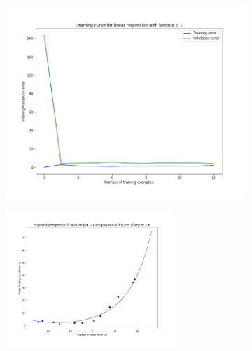 \documentclass[english,11pt]{article}
\begin{document}
\begin{figure}[H]
\centering
\begin{subfigure}{.5\textwidth}
\centering
\includegraphics[width=.7\linewidth]{../hw1/part2/fig3_2_A4_learning_curve_lambda_1.png}
\end{subfigure}%
\begin{subfigure}{.5\textwidth}
\centering
\includegraphics[width=0.7\textwidth]{../hw1/part2/fig3_2_A4_polynomial_fit_lambda_1.png}
\end{subfigure}


\end{figure}
\end{document}
